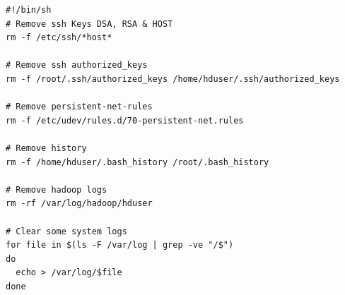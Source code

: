 \documentclass{sig-alternate}
\begin{document}
\begin{lstlisting}[caption=cloud-shtdwn, label=src:shtdwn]
#!/bin/sh
# Remove ssh Keys DSA, RSA & HOST
rm -f /etc/ssh/*host*

# Remove ssh authorized_keys
rm -f /root/.ssh/authorized_keys /home/hduser/.ssh/authorized_keys

# Remove persistent-net-rules
rm -f /etc/udev/rules.d/70-persistent-net.rules

# Remove history
rm -f /home/hduser/.bash_history /root/.bash_history

# Remove hadoop logs
rm -rf /var/log/hadoop/hduser

# Clear some system logs
for file in $(ls -F /var/log | grep -ve "/$")
do
  echo > /var/log/$file
done
\end{lstlisting}
\end{document}
